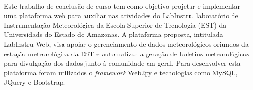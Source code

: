 \ \ \\[2cm]
Este trabalho de conclusão de curso tem como objetivo projetar e implementar uma plataforma web para auxiliar nas atividades do LabInstru, laboratório de Instrumentação Meteorológica da Escola Superior de Tecnologia (EST) da Universidade do Estado do Amazonas. A plataforma proposta, intitulada LabInstru Web, visa apoiar o gerenciamento de dados meteorológicos oriundos da estação meteorológica da EST e automatizar a geração de boletins meteorológicos para divulgação dos dados junto à comunidade em geral. Para desenvolver esta plataforma foram utilizados o \emph{framework} Web2py e tecnologias como MySQL, JQuery e Bootstrap.

